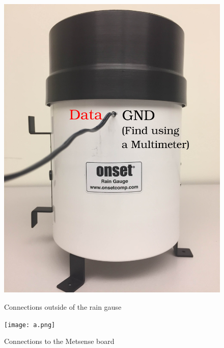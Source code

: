\begin{figure}[!htb]
  \includegraphics[width=\linewidth]{gauge.png}
  \caption{Connections outside of the rain gause}
  \label{fig:gauge_out}
\endminipage\hfill
{}%
  \texttt{[image: a.png]}
  \caption{Connections to the Metsense board}
  \label{fig:gauge_board}
\endminipage
\end{figure}

\clearpage